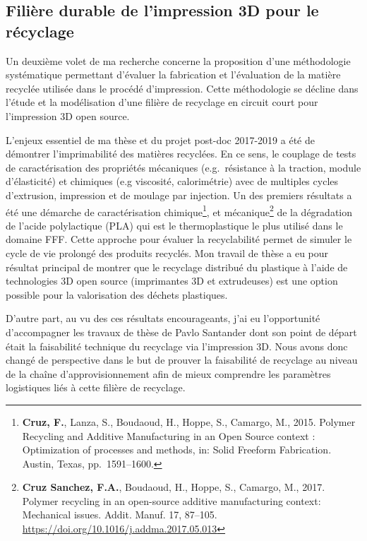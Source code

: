 \documentclass[
  12pt,
  oneside]{book}
\begin{document}
\hypertarget{filiuxe8re-durable-de-limpression-3d-pour-le-ruxe9cyclage}{%
\subsection{Filière durable de l'impression 3D pour le récyclage}\label{filiuxe8re-durable-de-limpression-3d-pour-le-ruxe9cyclage}}

Un deuxième volet de ma recherche concerne la proposition d'une méthodologie systématique permettant d'évaluer la fabrication et l'évaluation de la matière recyclée utilisée dans le procédé d'impression.
Cette méthodologie se décline dans l'étude et la modélisation d'une filière de recyclage en circuit court pour l'impression 3D open source.

L'enjeux essentiel de ma thèse et du projet post-doc 2017-2019 a été de démontrer l'imprimabilité des matières recyclées. En ce sens, le couplage de tests de caractérisation des propriétés mécaniques (e.g.~résistance à la traction, module d'élasticité) et chimiques (e.g viscosité, calorimétrie) avec de multiples cycles d'extrusion, impression et de moulage par injection.
Un des premiers résultats a été une démarche de caractérisation chimique\footnote{\textbf{Cruz, F.}, Lanza, S., Boudaoud, H., Hoppe, S., Camargo, M., 2015. Polymer Recycling and Additive Manufacturing in an Open Source context : Optimization of processes and methods, in: Solid Freeform Fabrication. Austin, Texas, pp.~1591--1600.}, et mécanique\footnote{\textbf{Cruz Sanchez, F.A.}, Boudaoud, H., Hoppe, S., Camargo, M., 2017. Polymer recycling in an open-source additive manufacturing context: Mechanical issues. Addit. Manuf. 17, 87--105. \url{https://doi.org/10.1016/j.addma.2017.05.013}} de la dégradation de l'acide polylactique (PLA) qui est le thermoplastique le plus utilisé dans le domaine FFF.
Cette approche pour évaluer la recyclabilité permet de simuler le cycle de vie prolongé des produits recyclés.
Mon travail de thèse a eu pour résultat principal de montrer que le recyclage distribué du plastique à l'aide de technologies 3D open source (imprimantes 3D et extrudeuses) est une option possible pour la valorisation des déchets plastiques.

D'autre part, au vu des ces résultats encourageants, j'ai eu l'opportunité d'accompagner les travaux de thèse de Pavlo Santander dont son point de départ était la faisabilité technique du recyclage via l'impression 3D.
Nous avons donc changé de perspective dans le but de prouver la faisabilité de recyclage au niveau de la chaîne d'approvisionnement afin de mieux comprendre les paramètres logistiques liés à cette filière de recyclage.
\end{document}
